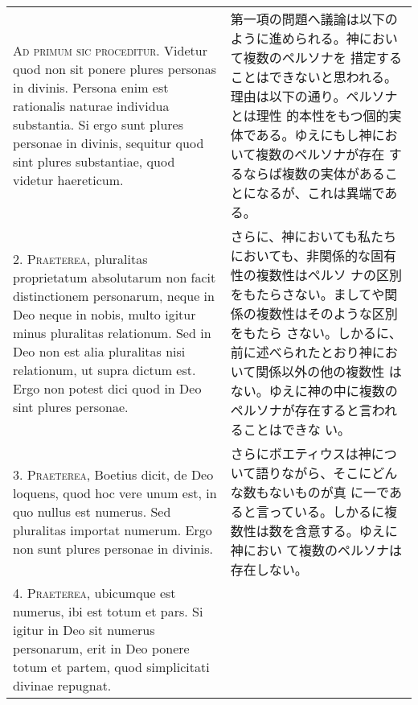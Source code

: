 \documentclass[10pt]{jsarticle} %
\begin{document}
\begin{longtable}{p{21em}p{21em}}

{\scshape Ad primum sic proceditur}. Videtur quod non sit ponere plures personas
in divinis. Persona enim est rationalis naturae individua
substantia. Si ergo sunt plures personae in divinis, sequitur quod
sint plures substantiae, quod videtur haereticum.


&

第一項の問題へ議論は以下のように進められる。神において複数のペルソナを
 措定することはできないと思われる。理由は以下の通り。ペルソナとは理性
 的本性をもつ個的実体である。ゆえにもし神において複数のペルソナが存在
 するならば複数の実体があることになるが、これは異端である。

\\



2. {\scshape Praeterea}, pluralitas proprietatum absolutarum non facit distinctionem
personarum, neque in Deo neque in nobis, multo igitur minus pluralitas
relationum. Sed in Deo non est alia pluralitas nisi relationum, ut
supra dictum est. Ergo non potest dici quod in Deo sint plures
personae.


&

さらに、神においても私たちにおいても、非関係的な固有性の複数性はペルソ
 ナの区別をもたらさない。ましてや関係の複数性はそのような区別をもたら
 さない。しかるに、前に述べられたとおり神において関係以外の他の複数性
 はない。ゆえに神の中に複数のペルソナが存在すると言われることはできな
 い。

\\



3. {\scshape Praeterea}, Boetius dicit, de Deo loquens, quod hoc vere unum est, in
quo nullus est numerus. Sed pluralitas importat numerum. Ergo non sunt
plures personae in divinis.


&

さらにボエティウスは神について語りながら、そこにどんな数もないものが真
 に一であると言っている。しかるに複数性は数を含意する。ゆえに神におい
 て複数のペルソナは存在しない。


\\



4. {\scshape Praeterea}, ubicumque est numerus, ibi est totum et pars. Si igitur in
Deo sit numerus personarum, erit in Deo ponere totum et partem, quod
simplicitati divinae repugnat.


&


\end{longtable}
\end{document}
